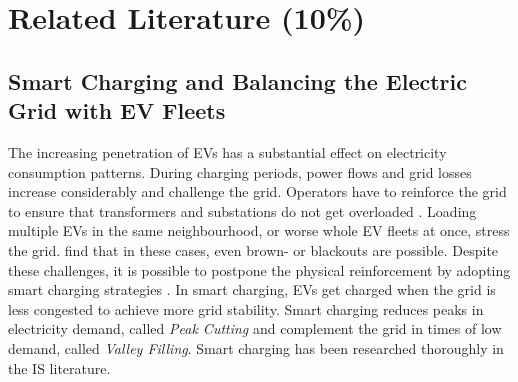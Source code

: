\documentclass[12pt, article]{article}
\begin{document}
\section{Related Literature (10\%)}
\label{sec:org8ceac6c}
\subsection{Smart Charging and Balancing the Electric Grid with EV Fleets}
\label{sec:orga21a834}
The increasing penetration of EVs has a substantial effect on electricity consumption
patterns. During charging periods, power flows and grid losses increase
considerably and challenge the grid. Operators have to reinforce the grid
to ensure that transformers and substations do not get overloaded
\parencite{sioshansi12_impac_elect_tarif_plug_in,lopes11_integ_elect_vehic_elect_power_system}.
Loading multiple EVs in the same neighbourhood, or worse whole EV fleets at
once, stress the grid. \textcite{kim12_carbit} find that in these cases, even
brown- or blackouts are possible. Despite these challenges, it is possible to
postpone the physical reinforcement by adopting smart charging strategies
\parencite{kim12_carbit}. In smart charging, EVs get charged when the grid is less
congested to achieve more grid stability. Smart charging reduces peaks in
electricity demand, called \emph{Peak Cutting} and complement the grid in times of
low demand, called \emph{Valley Filling}. Smart charging has been researched
thoroughly in the IS literature.
\end{document}
